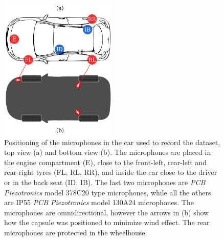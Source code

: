 \begin{figure}[ht]
	\centering
	\includegraphics[width=0.5\textwidth]{img/car-mic}
	\caption[Position of the microphones in the car used to record the dataset]{Positioning of the microphones in the car used to record the dataset, top view (a) and bottom view (b). The microphones are placed in the engine compartment (E), close to the front-left, rear-left and rear-right tyres (FL, RL, RR), and inside the car close to the driver or in the back seat (ID, IB). The last two microphones are \textit{PCB Piezotronics} model 378C20 type microphones, while all the others are IP55 \textit{PCB Piezotronics} model 130A24 microphones. The microphones are omnidirectional, however the arrows in (b) show how the capsule was positioned to minimize wind effect. The rear microphones are protected in the wheelhouse.}
	\label{fig:car-mic}
\end{figure}

